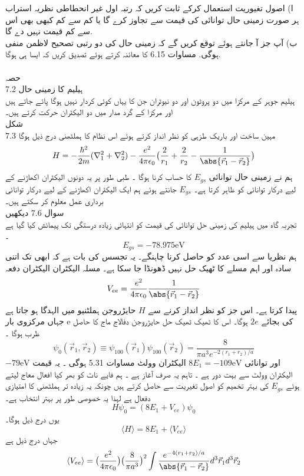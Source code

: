 ا) اصول تغيوریت استعمال کرکے ثابت کریں کہ رتبہ اول غير انحطاطی نظریہ استراب ہر صورت زمینی حال توانائی کی قیمت سے تجاوز کرے گا يا كم سے كم کبھی بھی اس سے كم قیمت نہیں دے گا.\\
ب) آپ جز آ جانتے ہوئے توقع کریں گے کہ زمینی حال کی دو رتبی تصحیح لاظمن منفی ہوگی. مساوات 6.15 کا معائنہ كرتے ہوئے تصدیق كريں کہ ایسا ہی ہوگا. \\
\\
حصہ \\7.2
ہیلیم کا زمینی حال\\ 
ہیلیم جوہر کے مرکزا میں دو پروٹون اور دو نیوٹران جن کا یہاں کوئی کردار نہیں ہوگا پائے جاتے ہیں اور مرکزا کے گرد مدار میں دو الیکٹران حرکت کرتے ہیں۔\\
شکل \\7.3
مہین ساخت اور باریک طزہی کو نظر انداز کرتے ہوئے اس نظام کا ہملٹھنی درج ذیل ہوگا 
\[H=-\frac{\hbar^{2}}{2m}(\nabla_{1}^{2}+\nabla_{2}^{2})-\frac{e^{2}}{4\pi\epsilon_{0}}\big (\frac{2}{r_{1}}+\frac{2}{r_{2}}-\frac{1}{\abs{\vec{r}_{1}-\vec{r}_{2}}}\big )\]
ہم نے زمینی حال توانائی 
 \(E_{gs}\)
  کا حساب کرنا ہوگا ۔ طبی طور پر یہ دونوں الیکٹران اکھاڑنے کے لیے درکار توانائی کو ظاہر کرتا ہے۔ 
 \(E_{gs}\)
   جانتے ہوئے ہم ایک الیکٹران اکھاڑنے کے لیے درکار توانائی برداری عمل معلوم کر سکتے ہیں۔\\
سوال 7.6 دیکھیں\\  
تجربہ گاہ میں ہیلیم کی زمینی حل توانائی کی قیمت کو انتہائی زیادہ درستگی تک پیمائش کیا گیا ہے ۔
\[E_{gs}=-78.975 \text{eV}\]
ہم نظریا سے اسی عدد کو حاصل کرنا چاہنگے۔ یہ تجسس کی بات ہے کہ ابھی تک اتنی سادہ اور اہم مسلے کا ٹھیک حل نہیں ڈھونڈا جا سکا ہے۔
مسلہ الیکٹران الیکٹران دفعہ 
\[V_{ee}=\frac{e^{2}}{4\pi\epsilon_{0}}\frac{1}{\abs{\vec{r}_{1}-\vec{r}_{2}}}\]
پیدا کرتا ہے۔ اس جز کو نظر انداز کرنے سے
 \(H \)
حایڑروجن ہملٹنیو میں الہدگا ہو جاتا ہے جہاں مرکزوی بار e کی بجائے
 \(2e\)
 ہوگا۔ اس کا ٹھیک ٹھیک حل حایڑروجن دفالاج ماج کا حاصل ظرب ہوگا ۔
\[\psi_{0}(\vec{r}_{1},\vec{r}_{2})\equiv \psi_{100}(\vec{r}_{1})\psi_{100}(\vec{r}_{2})=\frac{8}{\pi a^{3}e^{-2(r_{1}+r_{2})/a}}\]
اور توانائی
 \(8E_{1}=-109\text{eV}\)
 الیکٹران وولٹ  
مساوات 5.31 ہوگی ۔ یہ قیمت
 \(-79\text{eV}\) 
 الیکٹران وولٹ سے بہت دور ہے ۔ تاہم یہ صرف آغاز ہے ۔ ہم فایے ناٹ کو بھر کیا افعال معاج لیتے ہوئے  
 \(E_{gs}\)
  کی بہتر تخمیم کو اصول تغیریت سے حاصل کرتے ہیں چونکہ یہ زیادہ تر ہملٹھنی کا امتیازی  دفعال ہے لہذا یہ خصوصی طور پر بہتر انتخاب ہے۔
\[H\psi_{0}=(8E_{1}+V_{ee})\psi_{0}\]
یوں درج ذیل ہوگا۔ 
\[\langle H \rangle=8E_{1}+\langle V_{ee}\rangle\]
جہاں درج ذیل ہے 
\[\langle V_{ee}\rangle=\big(\frac{e^{2}}{4\pi\epsilon_{0}}\big )\big (\frac{8}{\pi a^{3}}\big )^{2}\int \frac{e^{-4(r_{1}+r_{2})/a}}{\abs{\vec{r}_{1}-\vec{r}_{2}}}d^{3}\vec{r}_{1}d^{3}\vec{r}_{2}\]
